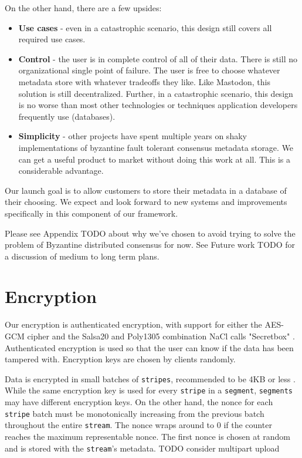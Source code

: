 \documentclass[11pt,fleqn,openany]{book}
\newcommand{\x}[1]{{\tt #1}} \newcommand{\code}[1]{{\tt #1}}
\newcommand{\todo}[1]{{\color{red} TODO #1 }}
\begin{document}
On the other hand, there are a few upsides:
\begin{itemize}
\item {\bf Use cases} - even in a catastrophic scenario, this design still
  covers all required use cases.
\item {\bf Control} - the user is in complete control of all of their data.
  There is still no organizational single point of failure. The user is free
  to choose whatever metadata store with whatever tradeoffs they like. Like
  Mastodon\cite{mastodon}, this solution is still decentralized. Further, in a
  catastrophic scenario, this design is no worse than most other technologies or
  techniques application developers frequently use (databases).
\item {\bf Simplicity} - other projects have spent multiple years on shaky
  implementations of byzantine fault tolerant consensus metadata storage.
  We can get a useful product to market without doing this work at all.
  This is a considerable advantage.
\end{itemize}

Our launch goal is to allow customers to store their metadata in a database of
their choosing. We expect and look forward to new systems and improvements
specifically in this component of our framework.

Please see Appendix \todo{} about why we've chosen to avoid trying to solve
the problem of Byzantine distributed consensus for now. See Future work
\todo{} for a discussion of medium to long term plans.

\section{Encryption}

Our encryption is authenticated encryption, with support for either the
AES-GCM cipher and the Salsa20 and Poly1305 combination NaCl calls "Secretbox"
\cite{nacl-crypto}. Authenticated encryption is used so that the user can know
if the data has been tampered with. Encryption keys are chosen by clients
randomly.

Data is encrypted in small batches of \x{stripes}, recommended to be 4KB or
less \cite{nacl-packetlen}. While the same encryption key is used for every
\x{stripe} in a \x{segment}, \x{segments} may have
different encryption keys. On the other hand, the nonce for each \x{stripe}
batch must be monotonically increasing from the previous batch throughout the
entire \x{stream}. The nonce wraps around to 0 if the counter reaches the
maximum representable nonce. The first nonce is chosen at random and is stored
with the \x{stream}'s metadata.
\todo{consider multipart upload}
\end{document}
